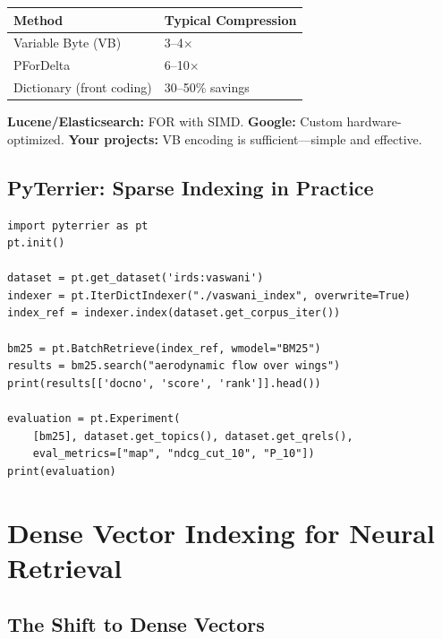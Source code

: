 \documentclass[11pt,a4paper]{article}
\theoremstyle{definition}
\theoremstyle{plain}
\begin{document}
\begin{center}
\begin{tabular}{ll}
\toprule
\textbf{Method} & \textbf{Typical Compression} \\
\midrule
Variable Byte (VB) & 3--4$\times$ \\
PForDelta & 6--10$\times$ \\
Dictionary (front coding) & 30--50\% savings \\
\bottomrule
\end{tabular}
\end{center}

\begin{production}
\textbf{Lucene/Elasticsearch:} FOR with SIMD. \textbf{Google:} Custom hardware-optimized. \textbf{Your projects:} VB encoding is sufficient---simple and effective.
\end{production}

\subsection{PyTerrier: Sparse Indexing in Practice}

\begin{lstlisting}[caption={Sparse indexing and BM25 retrieval with PyTerrier~\cite{macdonald2021pyterrier}.}]
import pyterrier as pt
pt.init()

dataset = pt.get_dataset('irds:vaswani')
indexer = pt.IterDictIndexer("./vaswani_index", overwrite=True)
index_ref = indexer.index(dataset.get_corpus_iter())

bm25 = pt.BatchRetrieve(index_ref, wmodel="BM25")
results = bm25.search("aerodynamic flow over wings")
print(results[['docno', 'score', 'rank']].head())

evaluation = pt.Experiment(
    [bm25], dataset.get_topics(), dataset.get_qrels(),
    eval_metrics=["map", "ndcg_cut_10", "P_10"])
print(evaluation)
\end{lstlisting}

\section{Dense Vector Indexing for Neural Retrieval}
\label{sec:dense}

\subsection{The Shift to Dense Vectors}
\end{document}
